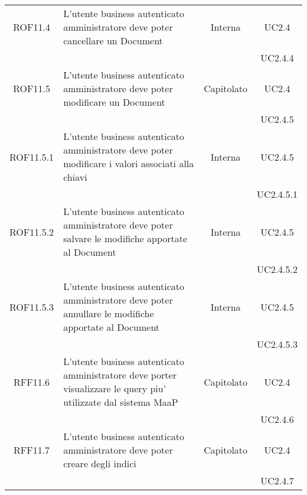 \begin{longtable}{|c|p{6cm}|c|c|}
\midrule
ROF11.4
& L'utente business autenticato amministratore deve poter cancellare un Document
& Interna
& UC2.4\\
& & & UC2.4.4
\\

\midrule
ROF11.5
& L'utente business autenticato amministratore deve poter modificare un Document
& Capitolato
& UC2.4\\
& & & UC2.4.5
\\

\midrule
ROF11.5.1
& L'utente business autenticato amministratore deve poter modificare i valori associati alla chiavi
& Interna
& UC2.4.5\\
& & & UC2.4.5.1
\\

\midrule
ROF11.5.2
& L'utente business autenticato amministratore deve poter salvare le modifiche apportate al Document
& Interna
& UC2.4.5\\
& & & UC2.4.5.2
\\

\midrule
ROF11.5.3
& L'utente business autenticato amministratore deve poter annullare le modifiche apportate al Document
& Interna
& UC2.4.5\\
& & & UC2.4.5.3
\\

\midrule
RFF11.6
& L'utente business autenticato amministratore deve porter visualizzare le query piu' utilizzate dal sistema MaaP
& Capitolato
& UC2.4\\
& & & UC2.4.6
\\

\midrule
RFF11.7
& L'utente business autenticato amministratore deve poter creare degli indici
& Capitolato
& UC2.4\\
& & & UC2.4.7
\\

\end{longtable}

\newpage
